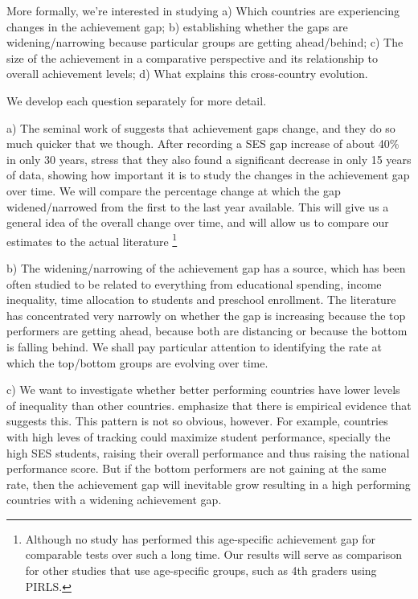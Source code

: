 \documentclass[11pt, a4paper]{article}\usepackage[]{graphicx}\usepackage[]{color}
\begin{document}
More formally, we're interested in studying
a) Which countries are experiencing changes in the achievement gap;
b) establishing whether the gaps are widening/narrowing because particular groups are getting ahead/behind;
c) The size of the achievement in a comparative perspective and its relationship to overall achievement levels;
d) What explains this cross-country evolution.

We develop each question separately for more detail.

a) The seminal work of \citet{reardon2011} suggests that achievement gaps change, and they do so much quicker that we though. After recording a SES gap increase of about 40\% in only 30 years, \citet{reardon_portilla} stress that they also found a significant decrease in only 15 years of data, showing how important it is to study the changes in the achievement gap over time. We will compare the percentage change at which the gap widened/narrowed from the first to the last year available. This will give us a general idea of the overall change over time, and will allow us to compare our estimates to the actual literature \footnote{Although no study has performed this age-specific achievement gap for comparable tests over such a long time. Our results will serve as comparison for other studies that use age-specific groups, such as 4th graders using PIRLS.}

b) The widening/narrowing of the achievement gap has a source, which has been often studied to be related to everything from educational spending, income inequality, time allocation to students and preschool enrollment. The literature has concentrated very narrowly on whether the gap is increasing because the top performers are getting ahead, because both are distancing or because the bottom is falling behind. We shall pay particular attention to identifying the rate at which the top/bottom groups are evolving over time.

c) We want to investigate whether better performing countries have lower levels of inequality than other countries. \citet{werfhorst_mijs} emphasize that there is empirical evidence that suggests this. This pattern is not so obvious, however. For example, countries with high leves of tracking could maximize student performance, specially the high SES students, raising their overall performance and thus raising the national performance score. But if the bottom performers are not gaining at the same rate, then the achievement gap will inevitable grow resulting in a high performing countries with a widening achievement gap.
\end{document}

